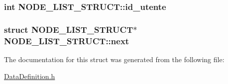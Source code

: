 \hypertarget{structNODE__LIST__STRUCT_a5887adfa6a4a3b94ba786593a12fa7ad}{
\subsubsection[{id\-\_\-utente}]{\setlength{\rightskip}{0pt plus 5cm}int N\-O\-D\-E\-\_\-\-L\-I\-S\-T\-\_\-\-S\-T\-R\-U\-C\-T\-::id\-\_\-utente}}\label{structNODE__LIST__STRUCT_a5887adfa6a4a3b94ba786593a12fa7ad}
\hypertarget{structNODE__LIST__STRUCT_a16cafa75205cd9acf5039b4502613f1a}{
\subsubsection[{next}]{\setlength{\rightskip}{0pt plus 5cm}struct {\bf N\-O\-D\-E\-\_\-\-L\-I\-S\-T\-\_\-\-S\-T\-R\-U\-C\-T}$\ast$ N\-O\-D\-E\-\_\-\-L\-I\-S\-T\-\_\-\-S\-T\-R\-U\-C\-T\-::next}}\label{structNODE__LIST__STRUCT_a16cafa75205cd9acf5039b4502613f1a}


The documentation for this struct was generated from the following file\-:\begin{DoxyCompactItemize}
\item 
\hyperlink{DataDefinition_8h}{Data\-Definition.\-h}\end{DoxyCompactItemize}
